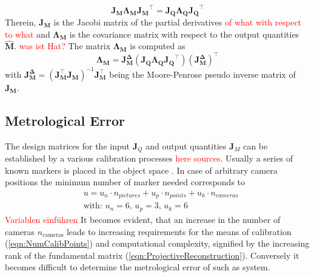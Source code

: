 \documentclass[5p,times,procedia]{elsarticle}
\begin{document}
\begin{equation}
	\mathbf{J_{M}}\mathbf{\Lambda_{M}}\mathbf{J_{M}}^{\top} = \mathbf{J_{Q}}\mathbf{\Lambda_{Q}}\mathbf{J_{Q}}^{\top}
\end{equation}
Therein, $\mathbf{J_{M}}$ is the Jacobi matrix of the partial derivatives \textcolor{red}{of what with respect to what} and $\mathbf{\Lambda_{M}}$ is the covariance matrix with respect to the output quantities $\hat{\mathbf{M}}$.
\textcolor{red}{was ist Hat?}
The matrix $\mathbf{\Lambda_{M}}$ is computed as
\begin{equation}
	\mathbf{\Lambda_{M}} = \mathbf{J_{M}^{\Delta}} \left( \mathbf{J_{Q}}\mathbf{\Lambda_{Q}}\mathbf{J_{Q}}^{\top}\right) \left(\mathbf{J_{M}^{\Delta}}\right)^{\top}
\end{equation}
with $ \mathbf{J_{M}^{\Delta}} = \left( \mathbf{J_{M}^{\top}} \mathbf{J_{M}^{}} \right)^{-1}\mathbf{J_{M}^{\top}}$ being the Moore-Penrose pseudo inverse matrix of $\mathbf{J_M}$.

\subsection{Metrological Error}
\label{error_estimate}

The design matrices for the input $\mathbf{J}_{Q}$ and output quantities $\mathbf{J}_{M}$ can be established by a various calibration processes \textcolor{red}{here sources}. Usually a series of known markers is placed in the object space \cite{Luhmann2003}. In case of arbitrary camera positions the minimum number of marker needed corresponds to
\begin{equation}
	\label{eqn:NumCalibPoints}
	\begin{aligned}
		& 	u = u_n \cdot n_{pictures} + u_p \cdot n_{points} + u_k \cdot n_{cameras} \\
		& \text{with: } u_n = 6\text{, } u_p = 3\text{, } u_k = 6 
	\end{aligned}
\end{equation}
\textcolor{red}{Variablen einführen}
It becomes evident, that an increase in the number of cameras $n_{\text{cameras}}$ leads to increasing requirements for the means of calibration (\ref{eqn:NumCalibPoints}) and computational complexity, signified by the increasing rank of the fundamental matrix (\ref{eqn:ProjectiveReconstruction}). Conversely it becomes difficult to determine the metrological error of such as system.\\
\end{document}
